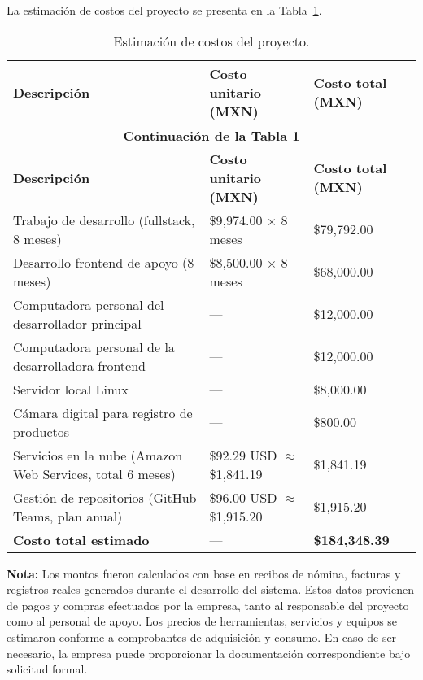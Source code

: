 La estimación de costos del proyecto se presenta en la Tabla~\ref{table:tablaCostos}.

\begin{longtable}{m{6.5cm} m{4.5cm} m{4cm}}
	\caption{Estimación de costos del proyecto.}
  	\label{table:tablaCostos}\\
  	\toprule
	\textbf{Descripción} & \textbf{Costo unitario (MXN)} & \textbf{Costo total (MXN)} \\
	\hline
	\endfirsthead

	\multicolumn{3}{c}{\textbf{Continuación de la Tabla \ref{table:tablaCostos}}}\\
	\hline
	\textbf{Descripción} & \textbf{Costo unitario (MXN)} & \textbf{Costo total (MXN)} \\
	\hline
	\endhead

	\hline
	\endlastfoot

Trabajo de desarrollo (fullstack, 8 meses) & \$9,974.00 $\times$ 8 meses & \$79,792.00 \\
\midrule

Desarrollo frontend de apoyo (8 meses) & \$8,500.00 $\times$ 8 meses & \$68,000.00 \\
\midrule

Computadora personal del desarrollador principal & — & \$12,000.00 \\
\midrule

Computadora personal de la desarrolladora frontend & — & \$12,000.00 \\
\midrule

Servidor local Linux & — & \$8,000.00 \\
\midrule

Cámara digital para registro de productos & — & \$800.00 \\
\midrule

Servicios en la nube (Amazon Web Services, total 6 meses) & \$92.29 USD $\approx$ \$1,841.19 & \$1,841.19 \\
\midrule

Gestión de repositorios (GitHub Teams, plan anual) & \$96.00 USD $\approx$ \$1,915.20 & \$1,915.20 \\
\midrule

\textbf{Costo total estimado} & — & \textbf{\$184,348.39} \\
\bottomrule
\end{longtable}

\noindent
\textbf{Nota:} Los montos fueron calculados con base en recibos de nómina, facturas y registros reales generados durante el desarrollo del sistema. Estos datos provienen de pagos y compras efectuados por la empresa, tanto al responsable del proyecto como al personal de apoyo. Los precios de herramientas, servicios y equipos se estimaron conforme a comprobantes de adquisición y consumo. En caso de ser necesario, la empresa puede proporcionar la documentación correspondiente bajo solicitud formal.
